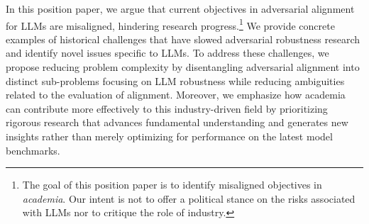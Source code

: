 In this position paper, we argue that current objectives in adversarial alignment for LLMs are misaligned, hindering research progress.\footnote{The goal of this position paper is to identify misaligned objectives in \textit{academia}. Our intent is not to offer a political stance on the risks associated with LLMs nor to critique the role of industry.} 
We provide concrete examples of historical challenges that have slowed adversarial robustness research and identify novel issues specific to LLMs. To address these challenges, we propose reducing problem complexity by disentangling adversarial alignment into distinct sub-problems focusing on LLM robustness while reducing ambiguities related to the evaluation of alignment.
Moreover, we emphasize how academia can contribute more effectively to this industry-driven field by prioritizing rigorous research that advances fundamental understanding and generates new insights rather than merely optimizing for performance on the latest model benchmarks. 

%
